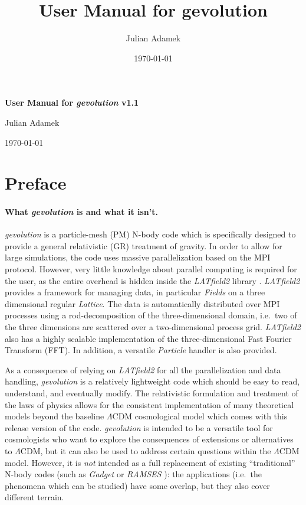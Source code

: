\documentclass[a4paper,10pt]{article}
\title{User Manual for gevolution}
\author{Julian Adamek}
\date{\today}
\begin{document}
\centerline{\textbf{\huge User Manual for \textit{gevolution} v1.1}}
\vspace{1cm}
\centerline{\large Julian Adamek}
\medskip
\centerline{\today}

\tableofcontents

\section{Preface}

\paragraph{What \textit{gevolution} is and what it isn't.} \textit{gevolution} is a particle-mesh (PM) N-body code which is
specifically designed to provide a general relativistic (GR) treatment of gravity. In order to allow for large simulations, the code uses
massive parallelization based on the MPI protocol. However, very little knowledge about parallel computing is required for the user, as the
entire overhead is hidden inside the \textit{LATfield2} library \cite{David:2015eya}. \textit{LATfield2} provides a framework for managing
data, in particular
\textit{Fields} on a three dimensional regular \textit{Lattice}. The data is automatically distributed over MPI processes using a
rod-decomposition of the three-dimensional domain, i.e.\ two of the three dimensions are scattered over a two-dimensional process grid.
\textit{LATfield2} also has a highly scalable implementation of the three-dimensional Fast Fourier Transform (FFT). In addition, a
versatile \textit{Particle} handler is also provided.

As a consequence of relying on \textit{LATfield2} for all the parallelization and data handling, \textit{gevolution} is a relatively
lightweight code which should be easy to read, understand, and eventually modify. The relativistic formulation and treatment of the laws
of physics allows for the consistent implementation of many theoretical models beyond the baseline $\mathsf{\Lambda}$CDM cosmological
model which comes with this release version of the code. \textit{gevolution} is intended to be a versatile tool for cosmologists who want
to explore the consequences of extensions or alternatives to $\mathsf{\Lambda}$CDM, but it can also be used to address certain questions
within the $\mathsf{\Lambda}$CDM model. However, it is \textit{not} intended as a full replacement of existing ``traditional'' N-body codes
(such as \textit{Gadget} \cite{Springel:2000yr,Springel:2005mi} or \textit{RAMSES} \cite{Teyssier:2001cp}): the applications (i.e.\ the
phenomena which can be studied) have some overlap, but they also cover different terrain.
\end{document}

